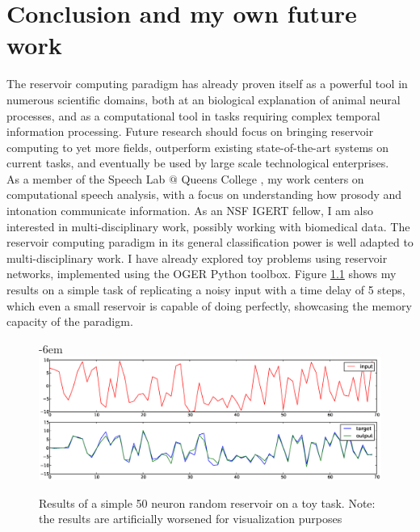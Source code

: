 \documentclass[12pt,oneside]{CUNY_CS_PhD}
\begin{document}
\chapter{Conclusion and my own future work}
The reservoir computing paradigm has already proven itself as a powerful tool in numerous scientific domains, both at an biological explanation of animal neural processes, and as a computational tool in tasks requiring complex temporal information processing. Future research should focus on bringing reservoir computing to yet more fields, outperform existing state-of-the-art systems on current tasks, and eventually be used by large scale technological enterprises.\\
As a member of the Speech Lab $@$ Queens College \cite{slqc}, my work centers on computational speech analysis, with a focus on understanding how prosody and intonation communicate information. As an NSF IGERT \cite{igert} fellow, I am also interested in multi-disciplinary work, possibly working with biomedical data. The reservoir computing paradigm in its general classification power is well adapted to multi-disciplinary work. I have already explored toy problems using reservoir networks, implemented using the OGER \cite{oger} Python toolbox. Figure \ref{fig:myres} shows my results on a simple task of replicating a noisy input with a time delay of 5 steps, which even a small reservoir is capable of doing perfectly, showcasing the memory capacity of the paradigm.
\begin{figure}[h]
\leftskip-6em
\includegraphics[width=\paperwidth]{pictures/my-res1.eps}
\caption{Results of a simple 50 neuron random reservoir on a toy task. Note: the results are artificially worsened for visualization
purposes}
\label{fig:myres}
\end{figure}\\


\backmatter



\end{document}
